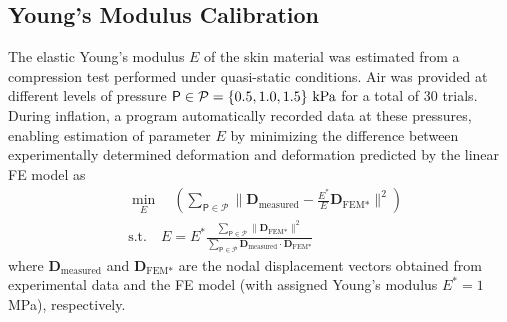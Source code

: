 \documentclass[10pt,letterpaper,journal,final,twoside,twocolumn,nofonttune]{IEEEtran}
\begin{document}
\subsection{Young's Modulus Calibration}
The elastic Young's modulus $E$ of the skin material was estimated from a compression test performed under quasi-static conditions. Air was provided at different levels of pressure $\mathsf{P} \in \mathcal{P}=\set{0.5, 1.0, 1.5}\,\text{kPa}$ for a total of 30 trials. During inflation, a program automatically recorded data at these pressures, enabling estimation of parameter $E$ by minimizing the difference between experimentally determined deformation and deformation predicted by the linear FE model as
\begin{align}
\label{eq_experiment_calib}
&\min_E \quad \left(\sum\nolimits_{\mathsf{P}\in \mathcal{P}} \lVert \mathbf{D}_\text{measured} -\frac{E^{*}}{E} \mathbf{D}_\text{FEM*} \rVert^2 \right)\\
&\text{s.t.} \quad E = E^{*}\frac{\sum_{\mathsf{P}\in \mathcal{P}}  \lVert  \mathbf{D}_{\text{FEM*}} \rVert^2}{\sum_{\mathsf{P} \in \mathcal{P}}  {\mathbf{D}_\text{measured} \cdot\mathbf{D}_\text{FEM*}} }
\label{eq_experiment_E}
\end{align}
where $\mathbf{D}_\text{measured}$ and $\mathbf{D}_\text{FEM*}$ are the nodal displacement vectors obtained from  experimental data and the FE model (with assigned Young's modulus $E^{*}=1$\,MPa), respectively. 
\end{document}
